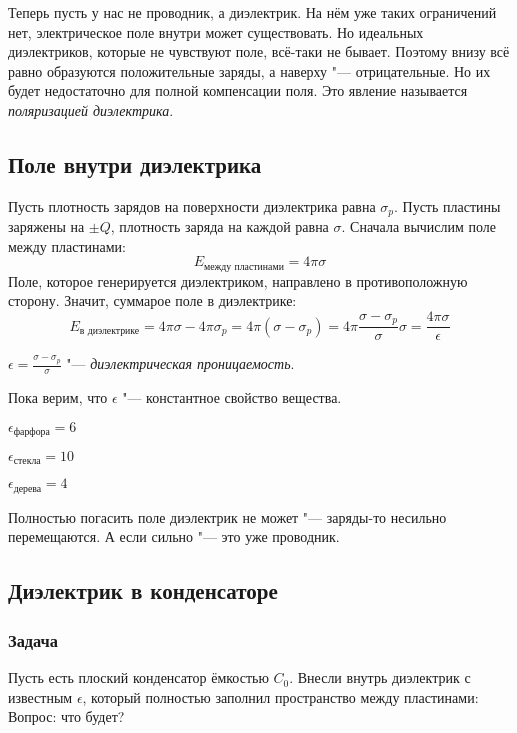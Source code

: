 		Теперь пусть у нас не проводник, а диэлектрик.
		На нём уже таких ограничений нет, электрическое поле внутри может существовать.
		Но идеальных диэлектриков, которые не чувствуют поле, всё-таки не бывает.
		Поэтому внизу всё равно образуются положительные заряды, а наверху "--- отрицательные.
		Но их будет недостаточно для полной компенсации поля.
		Это явление называется \textit{поляризацией диэлектрика}.

	\subsection{Поле внутри диэлектрика}
		Пусть плотность зарядов на поверхности диэлектрика равна $\sigma_p$.
		Пусть пластины заряжены на $\pm Q$, плотность заряда на каждой равна $\sigma$.
		Сначала вычислим поле между пластинами:
		\[E_{\text{между пластинами}} = 4\pi \sigma\]
		Поле, которое генерируется диэлектриком, направлено в противоположную сторону.
		Значит, суммарое поле в диэлектрике:
		\[ E_\text{в диэлектрике}
			= 4\pi\sigma - 4\pi\sigma_p
			= 4\pi(\sigma - \sigma_p)
			= 4\pi\frac{\sigma - \sigma_p}{\sigma}\sigma
			= \frac{4\pi\sigma}{\epsilon}
		\]
		\begin{Def}
			$\epsilon = \frac{\sigma - \sigma_p}{\sigma}$ "--- \textit{диэлектрическая проницаемость}.
		\end{Def}
		\begin{Rem}
			Пока верим, что $\epsilon$ "--- константное свойство вещества.
		\end{Rem}
		\begin{exmp}$\epsilon_\text{фарфора} = 6$\end{exmp}
		\begin{exmp}$\epsilon_\text{стекла} = 10$\end{exmp}
		\begin{exmp}$\epsilon_\text{дерева} = 4$\end{exmp}
		\begin{Rem}
			Полностью погасить поле диэлектрик не может "--- заряды-то несильно перемещаются.
			А если сильно "--- это уже проводник.
		\end{Rem}

	\subsection{Диэлектрик в конденсаторе}
		\subsubsection{Задача}
			Пусть есть плоский конденсатор ёмкостью $C_0$.
			Внесли внутрь диэлектрик с известным $\epsilon$, который полностью заполнил пространство между пластинами:
			Вопрос: что будет?

